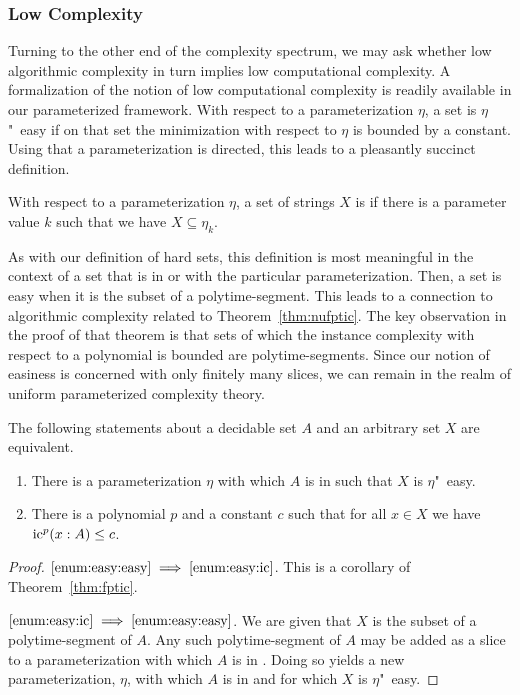 \subsubsection{Low Complexity}
Turning to the other end of the complexity spectrum, we may ask whether low algorithmic complexity in turn implies low computational complexity.
A formalization of the notion of low computational complexity is readily available in our parameterized framework.
With respect to a parameterization $\eta$, a set is $\eta$"~easy if on that set the minimization with respect to $\eta$ is bounded by a constant.
Using that a parameterization is directed, this leads to a pleasantly succinct definition.
\begin{definition}
\label{def:easy}%
  With respect to a parameterization $\eta$, a set of strings $X$ is  if there is a parameter value $k$ such that we have $X \subseteq \eta_k$.
\end{definition}
As with our definition of hard sets, this definition is most meaningful in the context of a set that is in  or  with the particular parameterization.
Then, a set is easy when it is the subset of a polytime-segment.
This leads to a connection to algorithmic complexity related to Theorem~\ref{thm:nufptic}.
The key observation in the proof of that theorem is that sets of which the instance complexity with respect to a polynomial is bounded are polytime-segments.
Since our notion of easiness is concerned with only finitely many slices, we can remain in the realm of uniform parameterized complexity theory.
\begin{theorem}
  The following statements about a decidable set $A$ and an arbitrary set $X$ are equivalent.
  \begin{enumerate}
  \item\label{enum:easy:easy}
    There is a parameterization $\eta$ with which $A$ is in  such that $X$ is $\eta$"~easy.
  \item\label{enum:easy:ic}
    There is a polynomial $p$ and a constant $c$ such that for all $x \in X$ we have $\operatorname{ic}^p(x : A) \le c$.
  \end{enumerate}
\end{theorem}
\begin{proof}
$\ref{enum:easy:easy} \implies \ref{enum:easy:ic}$.
  This is a corollary of Theorem~\ref{thm:fptic}.

$\ref{enum:easy:ic} \implies \ref{enum:easy:easy}$.
  We are given that $X$ is the subset of a polytime-segment of $A$.
  Any such polytime-segment of $A$ may be added as a slice to a parameterization with which $A$ is in .
  Doing so yields a new parameterization, $\eta$, with which $A$ is in  and for which $X$ is $\eta$"~easy.
\end{proof}

